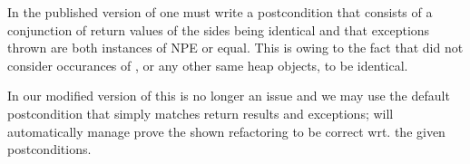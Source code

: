 In the published version of \Refinity{} one must write a postcondition that consists of a conjunction of return values of the sides being identical and
that exceptions thrown are both instances of NPE or equal.
This is owing to the fact that \Refinity{} did not consider occurances of , or any other same heap objects, to be identical.

In our modified version of \Refinity{} this is no longer an issue and we may use the default postcondition that simply matches return results and exceptions;
\Refinity{} will automatically manage prove the shown  refactoring to be correct wrt. the given postconditions.


